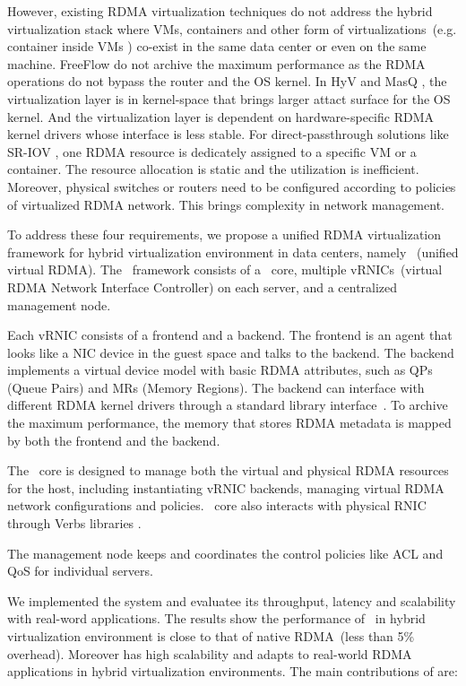 However, existing RDMA virtualization techniques do not address the hybrid virtualization stack where VMs, containers and other form of virtualizations~(e.g. container inside VMs \cite{containeronvm}) co-exist in the same data center or even on the same machine.
FreeFlow \cite{kim2019freeflow} do not archive the maximum performance as the RDMA operations do not bypass the router and the OS kernel.
In HyV \cite{pfefferle2015hybrid} and MasQ \cite{he2020masq}, the virtualization layer is in kernel-space that brings larger attact surface for the OS kernel. And the virtualization layer is dependent on hardware-specific RDMA kernel drivers whose interface is less stable. 
For direct-passthrough solutions like SR-IOV \cite{sr-iov}, one RDMA resource is dedicately assigned to a specific VM or a container. The resource allocation is static and the utilization is inefficient. Moreover, physical switches or routers need to be configured according to policies of virtualized RDMA network. This brings complexity in network management.

To address these four requirements, we propose a unified RDMA virtualization framework for hybrid virtualization environment in data centers, namely \sys~(unified virtual RDMA). The \sys~framework consists of a \sys~core, multiple vRNICs~(virtual RDMA Network Interface Controller) on each server, and a centralized management node.

Each vRNIC consists of a frontend and a backend. The frontend is an agent that looks like a NIC device in the guest space and talks to the backend. The backend implements a virtual device model with basic RDMA attributes, such as QPs (Queue Pairs) and MRs (Memory Regions). The backend can interface with different RDMA kernel drivers through a standard library interface~\cite{verbs}. To archive the maximum performance, the memory that stores RDMA metadata is mapped by both the frontend and the backend. 

The \sys~core is designed to manage both the virtual and physical RDMA resources for the host, including instantiating vRNIC backends, managing virtual RDMA network configurations and policies. \sys~core also interacts with physical RNIC through Verbs libraries \cite{verbs}.

The management node keeps and coordinates the control policies like ACL and QoS for individual servers.

We implemented the \sys system and evaluatee its throughput, latency and scalability with real-word applications. The results show the performance of \sys~in hybrid virtualization environment is close to that of native RDMA~(less than 5\% overhead). Moreover \sys has high scalability and adapts to real-world RDMA applications in hybrid virtualization environments. The main contributions of \sys are:

